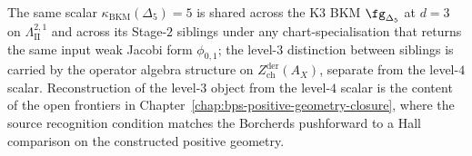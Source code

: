 The same scalar $\kappa_{\mathrm{BKM}}(\Delta_5) = 5$ is shared
across the K3 BKM $\fg_{\Delta_5}$ at $d = 3$ on
$\Lambda^{2, 1}_{\mathrm{II}}$ and across its Stage-$2$ siblings
under any chart-specialisation that returns the same input weak
Jacobi form $\phi_{0, 1}$; the level-$3$ distinction between
siblings is carried by the operator algebra structure on
$Z^{\mathrm{der}}_{\mathrm{ch}}(A_X)$, separate from the level-$4$
scalar.  Reconstruction of the level-$3$ object from the level-$4$
scalar is the content of the open frontiers in
Chapter~\ref{chap:bps-positive-geometry-closure}, where the source
recognition condition matches the Borcherds pushforward to a Hall
comparison on the constructed positive geometry.
